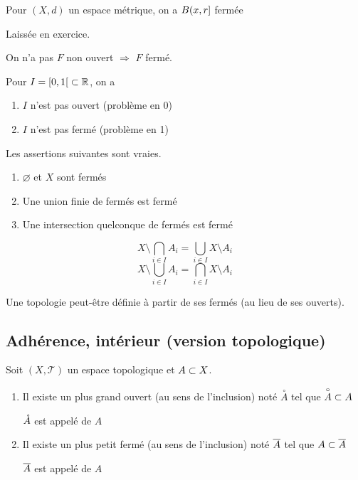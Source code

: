 \documentclass[french,a4paper,10pt]{article}
\begin{document}
	\begin{myexample} 
		Pour $(X, d)$ un espace métrique, on a $B({x, r}\mathopen{}]\mathclose{}$ fermée
	\end{myexample}
	\begin{myproof}
	Laissée en exercice.
	\end{myproof}
	
	\begin{myremark}
		On n'a pas $F$ non ouvert $\Longrightarrow$ $F$ fermé.
	\end{myremark}
	\begin{myexample}
		Pour $I = \mathopen{[}0, 1\mathclose{[}\subset\mathbb{R}$, on a
		\begin{enumerate}
			\item $I$ n'est pas ouvert (problème en 0)
			\item $I$ n'est pas fermé (problème en 1)
		\end{enumerate}
	\end{myexample}
	
	\begin{proposition}
		Les assertions suivantes sont vraies.
		\begin{enumerate}
			\item $\varnothing$ et $X$ sont fermés
			\item Une union finie de fermés est fermé
			\item Une intersection quelconque de fermés est fermé
		\end{enumerate}
	\end{proposition}
	\begin{myrappel}
		\[
		X\setminus\bigcap_{i\in I}A_i=\bigcup_{i\in I} X\setminus A_i
		\]
		\[
		X\setminus\bigcup_{i\in I}A_i=\bigcap_{i\in I} X\setminus A_i
		\]
	\end{myrappel}
	
	
	\begin{myremark}
		Une topologie peut-être définie à partir de ses fermés (au lieu de ses ouverts).
	\end{myremark}
	
	\subsection{Adhérence, intérieur (version topologique)}
	
	\begin{propdef}
		Soit $(X, \mathcal{T})$ un espace topologique et $A\subset X$.
		\begin{enumerate}
			\item Il existe un plus grand ouvert (au sens de l'inclusion) noté $ \overset{\circ}A$ tel que $\overset{\circ}A\subset A$
			
			$\mathring{A}$ est appelé  de $A$
			
			\item Il existe un plus petit fermé (au sens de l'inclusion) noté $ \overline{A}$ tel que $A\subset \overline{A}$
			
			$\overline{A}$ est appelé  de $A$
		\end{enumerate}
	\end{propdef}
	
\end{document}
